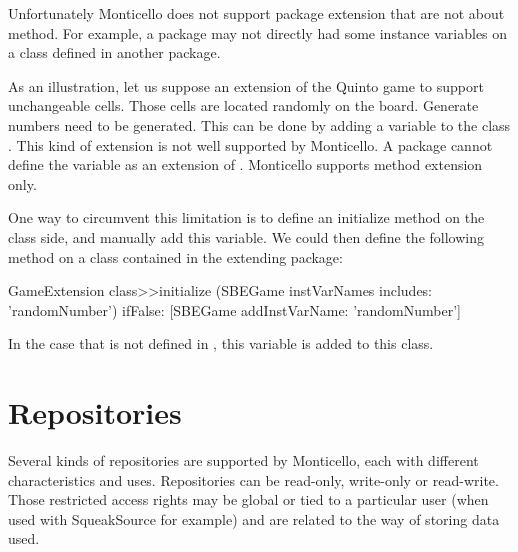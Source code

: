 \documentclass[a4paper,10pt,twoside]{book}
\begin{document}
Unfortunately Monticello does not support package extension that are not about method. For example, a package may not directly had some instance variables on a class defined in another package. 

As an illustration, let us suppose an extension of the Quinto game to support unchangeable cells. Those cells are located randomly on the board. Generate numbers need to be generated. This can be done by adding a variable  to the class . This kind of extension is not well supported by Monticello. A package cannot define the variable  as an extension of . Monticello supports method extension only.


One way to circumvent this limitation is to define an initialize method on the class side, and manually add this variable. We could then define the following  method on a class  contained in the extending package:

\begin{code}{}
GameExtension class>>initialize
	(SBEGame instVarNames includes: 'randomNumber') 
		ifFalse: [SBEGame addInstVarName: 'randomNumber']
\end{code}

In the case that  is not defined in , this variable is added to this class.


\section{Repositories}

Several kinds of repositories are supported by Monticello, each with different characteristics and uses. Repositories can be read-only, write-only or read-write. Those restricted access rights may be global or tied to a particular user (when used with SqueakSource for example) and are related to the way of storing data used.

\end{document}
